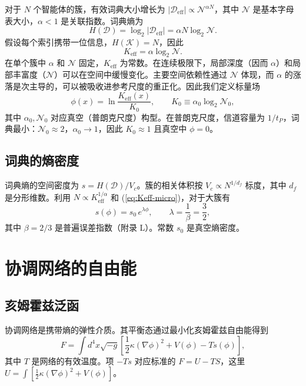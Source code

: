 \documentclass[12pt,a4paper]{article}
\newcommand{\Dir}{\mathcal{D}}
\begin{document}
	对于 \(N\) 个智能体的簇，有效词典大小增长为 \(|\Dir_{\mathrm{eff}}| \propto \mathcal{N}^{\alpha N}\)，其中 \(\mathcal{N}\) 是基本字母表大小，\(\alpha<1\) 是关联指数。词典熵为
	\[
	H(\Dir) = \log_2 |\Dir_{\mathrm{eff}}| = \alpha N \log_2 \mathcal{N}.
	\]
	假设每个索引携带一位信息，\(H(\mathcal{K}) = N\)，因此
	\begin{equation}
		K_{\mathrm{eff}} = \alpha \log_2 \mathcal{N}. \label{eq:Keff-micro}
	\end{equation}
	在单个簇中 \(\alpha\) 和 \(\mathcal{N}\) 固定，\(K_{\mathrm{eff}}\) 为常数。在连续极限下，局部深度（因而 \(\alpha\)）和局部丰富度（\(\mathcal{N}\)）可以在空间中缓慢变化。主要空间依赖性通过 \(\mathcal{N}\) 体现，而 \(\alpha\) 的涨落是次主导的，可以被吸收进参考尺度的重正化。因此我们定义标量场
	\begin{equation}
		\phi(x) = \ln \frac{K_{\mathrm{eff}}(x)}{K_0}, \qquad K_0 \equiv \alpha_0 \log_2 \mathcal{N}_0,
		\label{eq:phi-def}
	\end{equation}
	其中 \(\alpha_0,\mathcal{N}_0\) 对应真空（普朗克尺度）构型。在普朗克尺度，信道容量为 \(1/t_P\)，词典最小：\(\mathcal{N}_0 \approx 2\)，\(\alpha_0 \rightarrow 1\)，因此 \(K_0 \approx 1\) 且真空中 \(\phi=0\)。
	
	\subsection{词典的熵密度}
	词典熵的空间密度为 \(s = H(\Dir)/V_c\)。簇的相关体积按 \(V_c \propto N^{1/d_f}\) 标度，其中 \(d_f\) 是分形维数。利用 \(N \propto K_{\mathrm{eff}}^{1/\alpha}\) 和 (\ref{eq:Keff-micro})，对于大簇有
	\begin{equation}
		s(\phi) = s_0\, e^{\lambda\phi}, \qquad \lambda = \frac{1}{\beta} = \frac{3}{2},
		\label{eq:s-phi}
	\end{equation}
	其中 \(\beta = 2/3\) 是普遍误差指数（附录 L）。常数 \(s_0\) 是真空熵密度。
	
	\section{协调网络的自由能}
	
	\subsection{亥姆霍兹泛函}
	协调网络是携带熵的弹性介质。其平衡态通过最小化亥姆霍兹自由能得到
	\begin{equation}
		F = \int d^4x \sqrt{-g} \left[ \frac{1}{2}\kappa (\nabla\phi)^2 + V(\phi) - T s(\phi) \right],
		\label{eq:F}
	\end{equation}
	其中 \(T\) 是网络的有效温度。项 \(-Ts\) 对应标准的 \(F = U - TS\)，这里 \(U = \int [\frac12\kappa(\nabla\phi)^2 + V(\phi)]\)。
	
\end{document}
